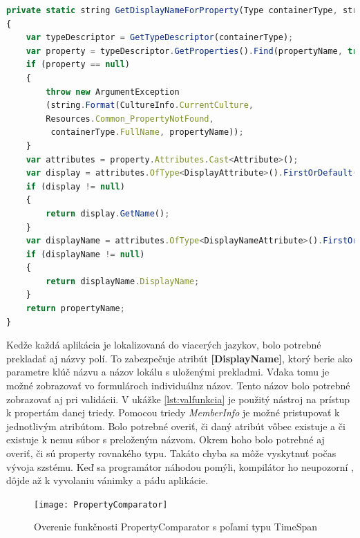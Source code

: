 \documentclass[11pt, oneside]{report}
\begin{document}
\begin{lstlisting}[language=Javascript,showstringspaces=false, caption= Klientská validácia- získanie preloženého mena,captionpos=b,label={lst:valfunkcia}]
private static string GetDisplayNameForProperty(Type containerType, string propertyName)
{
    var typeDescriptor = GetTypeDescriptor(containerType);
    var property = typeDescriptor.GetProperties().Find(propertyName, true);
    if (property == null)
    {
        throw new ArgumentException
        (string.Format(CultureInfo.CurrentCulture, 
        Resources.Common_PropertyNotFound,
         containerType.FullName, propertyName));
    }
    var attributes = property.Attributes.Cast<Attribute>();
    var display = attributes.OfType<DisplayAttribute>().FirstOrDefault();
    if (display != null)
    {
        return display.GetName();
    }
    var displayName = attributes.OfType<DisplayNameAttribute>().FirstOrDefault();
    if (displayName != null)
    {
        return displayName.DisplayName;
    }
    return propertyName;
}
\end{lstlisting}
Kedže každá aplikácia je lokalizovaná do viacerých jazykov, bolo potrebné prekladať aj názvy polí. To zabezpečuje atribút \textbf{[DisplayName]}, ktorý berie ako parametre klúč názvu a názov lokálu s uloženými prekladmi. Vďaka tomu je možné zobrazovať  vo formulároch individuálnz názov. Tento názov bolo potrebné  zobrazovať aj pri validácii.  V ukážke \ref{lst:valfunkcia} je použitý nástroj na prístup k propertám danej triedy. Pomocou triedy \textit{MemberInfo} je možné pristupovať  k jednotlivým atribútom. Bolo potrebné overiť, či   daný atribút vôbec existuje a či existuje  k nemu súbor s preloženým názvom.  Okrem hoho bolo potrebné aj overiť, či sú property rovnakého typu. Takáto chyba sa môže vyskytnuť počas  vývoja szstému. Keď sa  programátor náhodou pomýli, kompilátor ho neupozorní , dôjde až k  vyvolaniu vánimky a pádu aplikácie.
\begin{figure}[H]
    \centering
    \texttt{[image: PropertyComparator]}
    \caption{Overenie funkčnosti PropertyComparator s poľami typu TimeSpan}
    \label{fig:propertycompare}
\end{figure}
\end{document}
